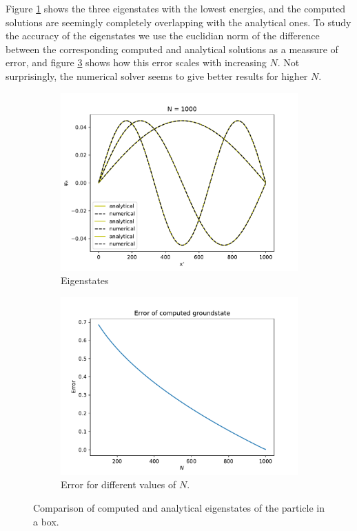 \documentclass{article}
\begin{document}
Figure \ref{fig:box-eigenstates} shows the three eigenstates with the lowest energies, and the computed solutions are seemingly completely overlapping with the analytical ones. To study the accuracy of the eigenstates we use the euclidian norm of the difference between the corresponding computed and analytical solutions as a meassure of error, and figure \ref{fig:box-eigenstates-error} shows how this error scales with increasing $N$. Not surprisingly, the numerical solver seems to give better results for higher $N$.

\begin{figure}[H]
    \begin{subfigure}[b]{0.5\textwidth}
        \includegraphics[width=\linewidth]{./media/eigenstates_empty_box.pdf}
        \caption{Eigenstates}
        \label{fig:box-eigenstates}
    \end{subfigure}
    \begin{subfigure}[b]{0.5\textwidth}
        \includegraphics[width=\linewidth]{./media/wf_error_scaling.pdf}
        \caption{Error for different values of $N$.}
        \label{fig:box-eigenstates-error}
    \end{subfigure}
    \caption{Comparison of computed and analytical eigenstates of the particle in a box.}
\end{figure}
\end{document}
